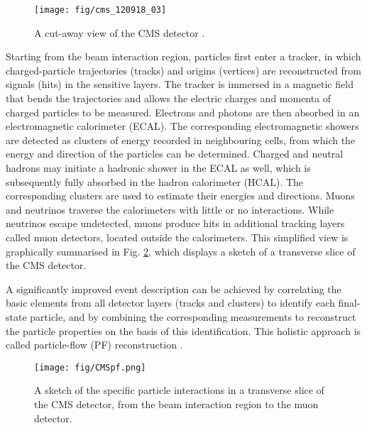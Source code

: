 \begin{figure}[hbtp]
\centering
\def\twidth{1}
\texttt{[image: fig/cms\_120918\_03]}
\caption{A cut-away view of the CMS detector \cite{Sakuma:2013jqa}.}
\label{fig:CMS_detector}
\end{figure}


Starting from the beam interaction region, particles first enter a tracker, in which charged-particle trajectories (tracks) and origins (vertices) are reconstructed from signals (hits) in the sensitive layers.  The tracker is immersed in a magnetic field that bends the trajectories and allows the electric charges and momenta of charged particles to be measured. Electrons and photons are then absorbed in an electromagnetic calorimeter (ECAL). The corresponding electromagnetic showers are detected as clusters of energy recorded in neighbouring cells, from which the energy and direction of the particles can be determined.  Charged and neutral hadrons may initiate a hadronic shower in the ECAL as well, which is subsequently fully absorbed in the hadron calorimeter (HCAL). The corresponding clusters are used to estimate their energies and directions.  Muons and neutrinos traverse the calorimeters with little or no interactions. While neutrinos escape undetected, muons produce hits in additional tracking layers called muon detectors, located outside the calorimeters. This simplified view is graphically summarised in Fig.  \ref{fig:CMSpf}, which displays a sketch of a transverse slice of the CMS detector.

A significantly improved event description can be achieved by correlating the basic elements from all detector layers (tracks and clusters) to identify each final-state particle, and by combining the corresponding measurements to reconstruct the particle properties on the basis of this identification. This holistic approach is called particle-flow (PF) reconstruction \cite{Sirunyan:2017ulk}.

\begin{figure}[h]
  \centering
  \texttt{[image: fig/CMSpf.png]}
  \caption{A sketch of the specific particle interactions in a transverse slice of the CMS detector, from the beam interaction region to the muon detector.}
  \label{fig:CMSpf}
\end{figure}

